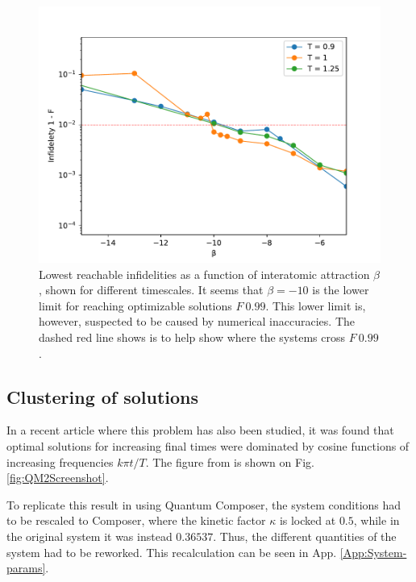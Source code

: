 \documentclass[a4paper, twocolumn]{revtex4-1}
\begin{document}
\begin{figure}
	\includegraphics[width=\columnwidth]{graphics/exploration/reachable_neg_beta.pdf}
	\caption{Lowest reachable infidelities as a function of interatomic attraction $\beta$, shown for different timescales. It seems that $\beta=-10$ is the lower limit for reaching optimizable solutions $F~0.99$. This lower limit is, however, suspected to be caused by numerical inaccuracies. The dashed red line shows is to help show where the systems cross $F~0.99$.}
	\label{fig:reachable_neg_betas}
\end{figure}

\subsection{\label{subsec:clustering}Clustering of solutions}

In a recent article where this problem has also been studied, it was found that optimal solutions for increasing final times were dominated by cosine functions of increasing frequencies $k\pi t/T$. The figure from \cite{QM2Paper} is shown on Fig. \ref{fig:QM2Screenshot}.

To replicate this result in using Quantum Composer, the system conditions had to be rescaled to Composer, where the kinetic factor $\kappa$ is locked at $0.5$, while in the original system it was instead $0.36537$. Thus, the different quantities of the system had to be reworked. This recalculation can be seen in App. \ref{App:System-params}. \\
\end{document}
